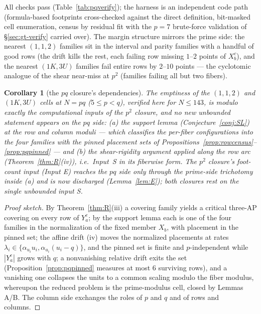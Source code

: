 \documentclass[11pt,a4paper]{article}
\numberwithin{equation}{section}
\theoremstyle{plain}
\theoremstyle{plain}
\newtheorem{corollary}[theorem]{Corollary}
\theoremstyle{definition}
\theoremstyle{remark}
\begin{document}
All checks pass (Table~\ref{tab:pqverify}); the harness is an independent
code path (formula-based footprints cross-checked against the direct
definition, bit-masked cell enumeration, census by residual fit with the
$p=7$ brute-force validation of \S\ref{sec:gt-verify} carried over). The
margin structure mirrors the prime side: the nearest $(1,1,2)$ families sit
in the interval and parity families with a handful of good rows (the drift
kills the rest, each failing row missing $1$--$2$ points of $X_b^c$), and the
nearest $(1K,3U)$ families fail entire rows by $2$--$10$ points --- the
cyclotomic analogue of the shear near-miss at $p^2$ (families failing all
but two fibers).

\begin{corollary}[the $pq$ closure's dependencies]\label{cor:pqdep}
The emptiness of the $(1,1,2)$ and $(1K,3U)$ cells at $N=pq$ ($5\le p<q$),
verified here for $N\le143$, is modulo exactly the computational inputs of
the $p^2$ closure, and no new unbounded statement appears on the $pq$
side: \emph{(a)} the support lemma (Conjecture~\ref{conj:SL}) at the row
and column moduli --- which classifies the per-fiber configurations into
the four families with the pinned placement sets of
Propositions~\ref{prop:rowcensus}--\ref{prop:pqpinned} --- and \emph{(b)}
the shear-rigidity argument applied along the row arc
(Theorem~\emph{\ref{thm:R}(iv)}), i.e.\ Input~S in its fiberwise form. The
$p^2$ closure's foot-count input (Input E) reaches the $pq$ side only
through the prime-side trichotomy inside \emph{(a)} and is now
discharged (Lemma~\ref{lem:E}); both closures rest
on the single unbounded input S.
\end{corollary}

\begin{proof}[Proof sketch]
By Theorem~\ref{thm:R}(iii) a covering family yields a critical three-AP
covering on every row of $Y_a^{c}$; by the support lemma each is one of the
four families in the normalization of the fixed member $X_b$, with placement
in the pinned set; the affine drift (iv) moves the normalized placements at
rates $\lambda_i\in\{\alpha_{u_i}u_i,\alpha_{u_i}(u_i-q)\}$, and the pinned
set is finite and $p$-independent while $|Y_a^{c}|$ grows with $q$; a
nonvanishing relative drift exits the set (Proposition~\ref{prop:pqpinned}
measures at most $6$ surviving rows), and a vanishing one collapses the units
to a common scaling modulo the fiber modulus, whereupon the reduced problem
is the prime-modulus cell, closed by Lemmas A/B. The column side exchanges
the roles of $p$ and $q$ and of rows and columns.
\end{proof}
\end{document}
